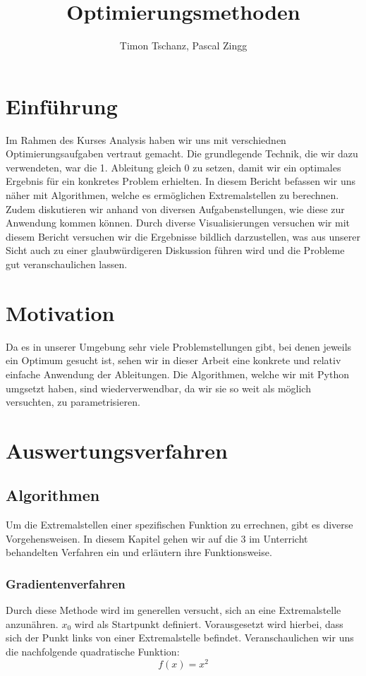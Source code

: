 \documentclass[10pt]{article}         %
\title{Optimierungsmethoden}
\author{Timon Tschanz, Pascal Zingg}
\begin{document}
\maketitle

\section{Einführung}
Im Rahmen des Kurses Analysis haben wir uns mit verschiednen Optimierungsaufgaben vertraut gemacht. Die grundlegende Technik, die wir dazu verwendeten, war die 1. Ableitung gleich 0 zu setzen, damit wir ein optimales Ergebnis für ein konkretes Problem erhielten. In diesem Bericht befassen wir uns näher mit Algorithmen, welche es ermöglichen Extremalstellen zu berechnen. Zudem diskutieren wir anhand von diversen Aufgabenstellungen, wie diese zur Anwendung kommen können. Durch diverse Visualisierungen versuchen wir mit diesem Bericht versuchen wir die Ergebnisse bildlich darzustellen, was aus unserer Sicht auch zu einer glaubwürdigeren Diskussion führen wird und die Probleme gut veranschaulichen lassen.

\section{Motivation}
Da es in unserer Umgebung sehr viele Problemstellungen gibt, bei denen jeweils ein Optimum gesucht ist, sehen wir in dieser Arbeit eine konkrete und relativ einfache Anwendung der Ableitungen. Die Algorithmen, welche wir mit Python umgsetzt haben, sind wiederverwendbar, da wir sie so weit als möglich versuchten, zu parametrisieren. 

\pagebreak
\section{Auswertungsverfahren}
\subsection{Algorithmen}
Um die Extremalstellen einer spezifischen Funktion zu errechnen, gibt es diverse Vorgehensweisen. In diesem Kapitel gehen wir auf die 3 im Unterricht behandelten Verfahren ein und erläutern ihre Funktionsweise. 

\subsubsection{Gradientenverfahren}
Durch diese Methode wird im generellen versucht, sich an eine Extremalstelle anzunähren. $x_0$ wird als Startpunkt definiert. Vorausgesetzt wird hierbei, dass sich der Punkt links von einer Extremalstelle befindet. Veranschaulichen wir uns die nachfolgende quadratische Funktion:
\[
    f(x)=x^2
\]
\end{document}
